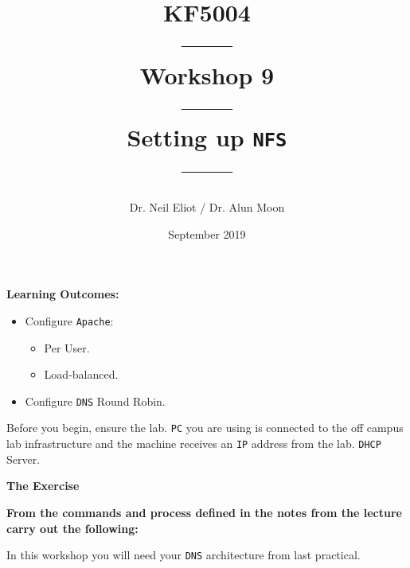 \documentclass[11pt]{article}
\begin{document}
\author{Dr. Neil Eliot / Dr. Alun Moon}
\title{KF5004\\------\\Workshop 9\\------\\Setting up \texttt{NFS}\\------}
\date{September 2019}
\maketitle

\newpage



\noindent\textbf{Learning Outcomes:}
\begin{itemize}
    \item Configure \texttt{Apache}:
        \begin{itemize}
            \item Per User.
            \item Load-balanced.
        \end{itemize}
    \item Configure \texttt{DNS} Round Robin.
\end{itemize}


\begin{tcolorbox}[title={\textbf{Important:}}]
    Before you begin, ensure the lab. \texttt{PC} you are using is connected to the off campus lab infrastructure and the machine receives an \texttt{IP} address from the lab. \texttt{DHCP} Server.
\end{tcolorbox}
\newpage

\noindent\textbf{The Exercise}\\
\begin{tcolorbox}[colback=blue!20]
    \noindent\textbf{From the commands and process defined in the notes from the lecture carry out the following:}
\end{tcolorbox}


\begin{tcolorbox}[title={\textbf{NOTE:}}]
    In this workshop you will need your \texttt{DNS} architecture from last practical.
\end{tcolorbox}
\end{document}
